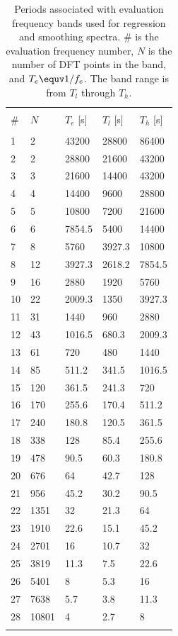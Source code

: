 \documentclass[draft,linenumbers]{agujournal2018}
\begin{document}
\begin{table}
\caption{Periods associated with evaluation frequency bands used for regression and smoothing spectra. \# is the evaluation frequency number, $N$ is the number of DFT points in the band, and $T_e\equv 1/f_e$. The band range is from $T_l$ through $T_h$.}
\centering
\begin{tabular}{l l l l l}
\hline \\
\# & $N$ & $T_e$ [s] & $T_l$ [s] & $T_h$ [s] \\
\hline \\
1 & 2 & 43200 & 28800 & 86400 \\
2 & 2 & 28800 & 21600 & 43200 \\
3 & 3 & 21600 & 14400 & 43200 \\
4 & 4 & 14400 & 9600 & 28800 \\
5 & 5 & 10800 & 7200 & 21600 \\
6 & 6 & 7854.5 & 5400 & 14400 \\
7 & 8 & 5760 & 3927.3 & 10800 \\
8 & 12 & 3927.3 & 2618.2 & 7854.5 \\
9 & 16 & 2880 & 1920 & 5760 \\
10 & 22 & 2009.3 & 1350 & 3927.3 \\
11 & 31 & 1440 & 960 & 2880 \\
12 & 43 & 1016.5 & 680.3 & 2009.3 \\
13 & 61 & 720 & 480 & 1440 \\
14 & 85 & 511.2 & 341.5 & 1016.5 \\
15 & 120 & 361.5 & 241.3 & 720 \\
16 & 170 & 255.6 & 170.4 & 511.2 \\
17 & 240 & 180.8 & 120.5 & 361.5 \\
18 & 338 & 128 & 85.4 & 255.6 \\
19 & 478 & 90.5 & 60.3 & 180.8 \\
20 & 676 & 64 & 42.7 & 128 \\
21 & 956 & 45.2 & 30.2 & 90.5 \\
22 & 1351 & 32 & 21.3 & 64 \\
23 & 1910 & 22.6 & 15.1 & 45.2 \\
24 & 2701 & 16 & 10.7 & 32 \\
25 & 3819 & 11.3 & 7.5 & 22.6 \\
26 & 5401 & 8 & 5.3 & 16 \\
27 & 7638 & 5.7 & 3.8 & 11.3 \\
28 & 10801 & 4 & 2.7 & 8 \\
\hline \\
\end{tabular}
\label{evaluationperiods}
\end{table}

\clearpage


\end{document}
